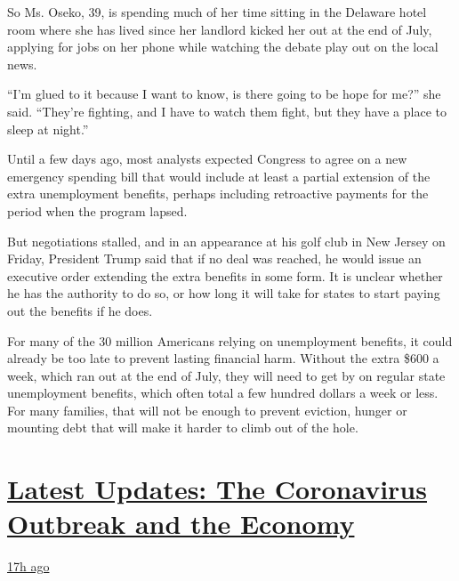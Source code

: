 So Ms. Oseko, 39, is spending much of her time sitting in the Delaware
hotel room where she has lived since her landlord kicked her out at the
end of July, applying for jobs on her phone while watching the debate
play out on the local news.

``I'm glued to it because I want to know, is there going to be hope for
me?'' she said. ``They're fighting, and I have to watch them fight, but
they have a place to sleep at night.''

Until a few days ago, most analysts expected Congress to agree on a new
emergency spending bill that would include at least a partial extension
of the extra unemployment benefits, perhaps including retroactive
payments for the period when the program lapsed.

But negotiations stalled, and in an appearance at his golf club in New
Jersey on Friday, President Trump said that if no deal was reached, he
would issue an executive order extending the extra benefits in some
form. It is unclear whether he has the authority to do so, or how long
it will take for states to start paying out the benefits if he does.

For many of the 30 million Americans relying on unemployment benefits,
it could already be too late to prevent lasting financial harm. Without
the extra \$600 a week, which ran out at the end of July, they will need
to get by on regular state unemployment benefits, which often total a
few hundred dollars a week or less. For many families, that will not be
enough to prevent eviction, hunger or mounting debt that will make it
harder to climb out of the hole.

\hypertarget{latest-updates-the-coronavirus-outbreak-and-the-economy}{%
\section{\texorpdfstring{\href{https://www.nytimes.com/live/2020/08/07/business/stock-market-today-coronavirus?action=click\&pgtype=Article\&state=default\&region=MAIN_CONTENT_1\&context=storylines_live_updates}{Latest
Updates: The Coronavirus Outbreak and the
Economy}}{Latest Updates: The Coronavirus Outbreak and the Economy}}\label{latest-updates-the-coronavirus-outbreak-and-the-economy}}

\href{https://www.nytimes.com/live/2020/08/07/business/stock-market-today-coronavirus?action=click\&pgtype=Article\&state=default\&region=MAIN_CONTENT_1\&context=storylines_live_updates\#wealthy-families-are-throwing-a-lifeline-to-distressed-businesses}{17h
ago}

